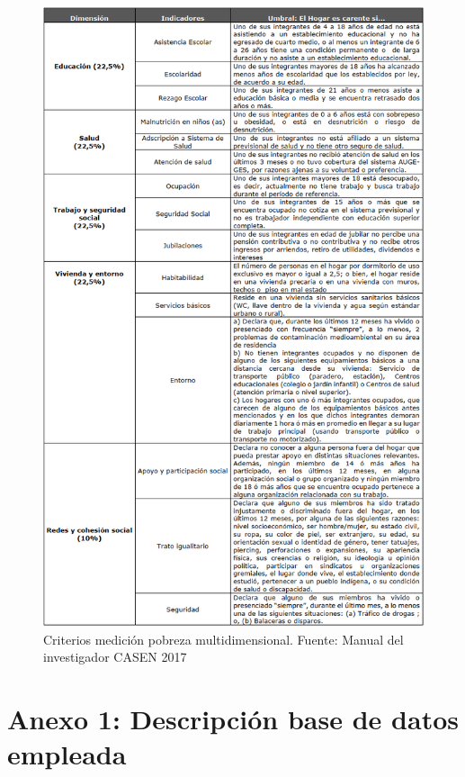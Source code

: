 \documentclass[12pt,letterpaper,spanish]{article}
\begin{document}
\begin{figure}[H]
    \centering
        \includegraphics[height=\textheight]{Criterios carencias - Manual del investigador.png}
    \caption{Criterios medición pobreza multidimensional. Fuente: Manual del investigador CASEN 2017}
    \label{criterios}
\end{figure}
\newpage
\section*{\centering Anexo 1: Descripción base de datos empleada}\label{descripcion_base_datos}
\end{document}
